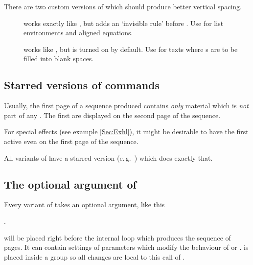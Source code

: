\begin{slide}
  \newslide

  There are two custom versions of  which should produce better vertical spacing.
  \begin{description}
  \item[]
     works exactly like , but adds
    an `invisible rule' before . Use for list environments and
    aligned equations.
  \item[]
     works like , but
     is turned on by default. Use for texts where
    s are to be filled into blank spaces.
  \end{description}

  \newslide

  \subsection{Starred versions of  commands}\label{Sec:StarredStepwise}%
  Usually, the first page of a sequence produced contains \emph{only} material which is \emph{not} part of any
  . The first  are displayed on the second page of the sequence.

  For special effects (see example \ref{Sec:Exhl}), it might be desirable to have the first  active
  even on the first page of the sequence.

  All variants of   have a starred version (e.\,g.\ ) which does exactly that.

  \newslide

  \subsection{The optional argument of }%
  Every variant of  takes an optional argument, like this
  \begin{center}
    .
  \end{center}
   will be placed right before the internal loop which produces the sequence of pages.  It can
  contain settings of parameters which modify the behaviour of  or . 
  is placed inside a group so all changes are local to this call of .


\end{slide}
